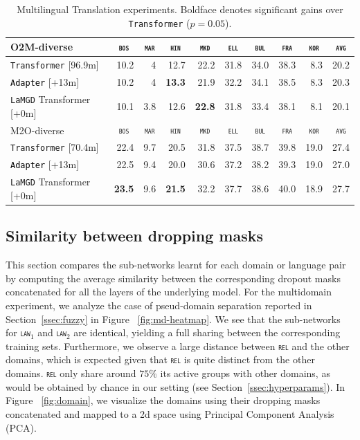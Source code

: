 \documentclass[11pt]{article}
\newcommand{\fyDone}[1]{\done[FY]\Todo[FY:]{\textcolor{orange}{#1}}}
\newcommand{\revision}[1]{\textcolor{black}{#1}}
\newcommand{\domain}[1]{\texttt{\textsc{#1}}}
\newcommand{\system}[1]{\texttt{{#1}}}
\newcommand{\SB}[1]{\textbf{#1}}
\begin{document}
\begin{table}[h!]
\begin{tabular}{|p{4cm}|*{9}{r|}}
    \hline
    \hline
    O2M-diverse & \multicolumn{1}{c|}{\domain{bos}} & \multicolumn{1}{c|}{\domain{mar}} & \multicolumn{1}{c|}{\domain{hin}} & \multicolumn{1}{c|}{\domain{mkd}} & \multicolumn{1}{c|}{\domain{ell}} & \multicolumn{1}{c|}{\domain{bul}} & \multicolumn{1}{c|}{\domain{fra}} & \multicolumn{1}{c|}{\domain{kor}} & \multicolumn{1}{c|}{\domain{avg}} \\ \hline 
    \system{Transformer}  \hfill{\footnotesize[96.9m]} & 10.2&4&12.7&22.2&31.8&34.0&38.3&8.3&20.2 \\
    \revision{\system{Adapter}}   \hfill{\footnotesize[+13m]}  &10.2&4&\SB{13.3}&21.9&32.2&34.1&38.5&8.3&20.3 \\ 
    \system{LaMGD} Transformer   \hfill{\footnotesize[+0m]}&10.1&3.8&12.6&\SB{22.8}&31.8&33.4&38.1&8.1&20.1\\
    \hline 
    \hline
    M2O-diverse & \multicolumn{1}{c|}{\domain{bos}} & \multicolumn{1}{c|}{\domain{mar}} & \multicolumn{1}{c|}{\domain{hin}} & \multicolumn{1}{c|}{\domain{mkd}} & \multicolumn{1}{c|}{\domain{ell}} & \multicolumn{1}{c|}{\domain{bul}} & \multicolumn{1}{c|}{\domain{fra}} & \multicolumn{1}{c|}{\domain{kor}} & \multicolumn{1}{c|}{\domain{avg}} \\ \hline 
    \system{Transformer}  \hfill{\footnotesize[70.4m]} &22.4&9.7&20.5&31.8&37.5&38.7&39.8&19.0&27.4 \\
    \revision{\system{Adapter}}   \hfill{\footnotesize[+13m]}  &22.5&9.4&20.0&30.6&37.2&38.2&39.3&19.0&27.0\\ 
    \system{LaMGD} Transformer  \hfill{\footnotesize[+0m]} &\SB{23.5}&9.6&\SB{21.5}&32.2&37.7&38.6&40.0&18.9&27.7 \\
    \hline
  \end{tabular}
  \caption{Multilingual Translation experiments. Boldface denotes significant gains over \system{Transformer} ($p=0.05$).\fyDone{What is the bold for ?}}
  \label{tab:multilingual}
\end{table}

\subsection{Similarity between dropping masks}
\label{ssec:abalation}
This section compares the sub-networks learnt for each domain or language pair by computing the average similarity between the corresponding dropout masks concatenated for all the layers of the underlying model. For the multidomain experiment, we analyze the case of pseud-domain separation reported in Section~\ref{ssec:fuzzy} in Figure ~\ref{fig:md-heatmap}. We see that the sub-networks for \domain{law$_1$} and \domain{law$_2$} are identical, yielding a full sharing between the corresponding training sets. Furthermore, we observe a large distance between \domain{rel} and the other domains, which is expected given that \domain{rel} is quite distinct from the other domains. \domain{rel} only share around $75 \%$ its active groups with other domains, as would be obtained by chance in our setting (see Section~\ref{ssec:hyperparams}). In Figure ~\ref{fig:domain}, we visualize the domains using their dropping masks concatenated and mapped to a 2d space using Principal Component Analysis (PCA).
\end{document}
